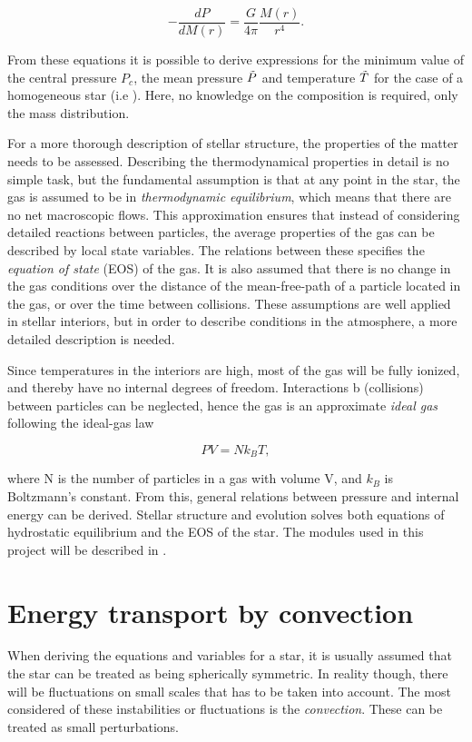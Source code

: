 \begin{equation}
    -\frac{dP}{dM(r)} = \frac{G}{4\pi}\frac{M(r)}{r^4}.
    \end{equation}

\noindent From these equations it is possible to derive expressions for the minimum value of the central pressure $P_c$, the mean pressure $\Tilde{P}$ and temperature $\Tilde{T}$ for the case of a homogeneous star (i.e ). Here, no knowledge on the composition is required, only the mass distribution.

For a more thorough description of stellar structure, the properties of the matter needs to be assessed. Describing the thermodynamical properties in detail is no simple task, but the fundamental assumption is that at any point in the star, the gas is assumed to be in \textit{thermodynamic equilibrium}, which means that there are no net macroscopic flows. This approximation ensures that instead of considering detailed reactions between particles, the average properties of the gas can be described by local state variables. The relations between these specifies the \textit{equation of state} (EOS) of the gas. It is also assumed that there is no change in the gas conditions over the distance of the mean-free-path of a particle located in the gas, or over the time between collisions. These assumptions are well applied in stellar interiors, but in order to describe conditions in the atmosphere, a more detailed description is needed. 

Since temperatures in the interiors are high, most of the gas will be fully ionized, and thereby have no internal degrees of freedom. Interactions b (collisions) between particles can be neglected, hence the gas is an approximate \textit{ideal gas} following the ideal-gas law

\begin{equation}
    PV = N k_B T,
\end{equation}

\noindent where N is the number of particles in a gas with volume V, and $k_B$ is Boltzmann's constant. From this, general relations between pressure and internal energy can be derived. Stellar structure and evolution solves both equations of hydrostatic equilibrium and the EOS of the star. The modules used in this project will be described in . 


\section{Energy transport by convection}
\label{sec:energybyconvection}
When deriving the equations and variables for a star, it is usually assumed that the star can be treated as being spherically symmetric. In reality though, there will be fluctuations on small scales that has to be taken into account. The most considered of these instabilities or fluctuations is the \textit{convection}. These can be treated as small perturbations. 

